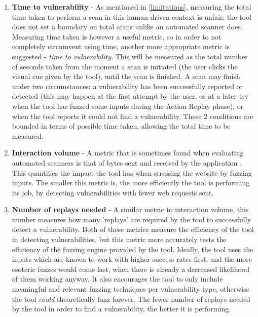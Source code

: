 \begin{enumerate}
	\item \textbf{Time to vulnerability} - As mentioned in \ref{limitations}, measuring the total time taken to perform a scan in this human driven context is unfair; the tool does not set a boundary on total scans unlike an automated scanner does. Measuring time taken is however a useful metric, so in order to not completely circumvent using time, another more appropriate metric is suggested - \emph{time to vulnerability}. This will be measured as the total number of seconds taken from the moment a scan is initiated (the user clicks the visual cue given by the tool), until the scan is finished. A scan may finish under two circumstances: a vulnerability has been successfully reported or detected (this may happen at the first attempt by the user, or at a later try when the tool has fuzzed some inputs during the Action Replay phase), or when the tool reports it could not find a vulnerability. These 2 conditions are bounded in terms of possible time taken, allowing the total time to be measured.
	
	\item \textbf{Interaction volume} - A metric that is sometimes found when evaluating automated scanners  is that of bytes sent and received by the application \cite{stateOfArtAutomatedBlackBoxWebAppVulnTesting}. This quantifies the impact the tool has when stressing the website by fuzzing inputs. The smaller this metric is, the more efficiently the tool is performing its job, by detecting vulnerabilities with fewer web requests sent.
	
	\item \textbf{Number of replays needed} - A similar metric to interaction volume, this number measures how many 'replays' are required by the tool to successfully detect a vulnerability. Both of these metrics measure the efficiency of the tool in detecting vulnerabilities, but this metric more accurately tests the efficiency of the fuzzing engine provided by the tool. Ideally, the tool uses the inputs which are known to work with higher success rates first, and the more esoteric fuzzes would come last, when there is already a decreased likelihood of them working anyway. It also encourages the tool to only include meaningful and relevant fuzzing techniques per vulnerability type, otherwise the tool \emph{could} theoretically fuzz forever. The fewer number of replays needed by the tool in order to find a vulnerability, the better it is performing.
	
\end{enumerate}


